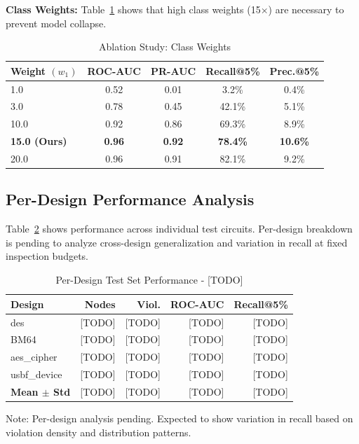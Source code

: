 \documentclass[10pt,twocolumn,journal]{IEEEtran}
\begin{document}
\textbf{Class Weights:} Table~\ref{tab:ablation_weights} shows that high class weights (15$\times$) are necessary to prevent model collapse.

\begin{table}[t]
\centering
\caption{Ablation Study: Class Weights}
\label{tab:ablation_weights}
\begin{tabular}{@{}lcccc@{}}
\toprule
\textbf{Weight $(w_1)$} & \textbf{ROC-AUC} & \textbf{PR-AUC} & \textbf{Recall@5\%} & \textbf{Prec.@5\%} \\
\midrule
1.0 & 0.52 & 0.01 & 3.2\% & 0.4\% \\
3.0 & 0.78 & 0.45 & 42.1\% & 5.1\% \\
10.0 & 0.92 & 0.86 & 69.3\% & 8.9\% \\
\textbf{15.0 (Ours)} & \textbf{0.96} & \textbf{0.92} & \textbf{78.4\%} & \textbf{10.6\%} \\
20.0 & 0.96 & 0.91 & 82.1\% & 9.2\% \\
\bottomrule
\end{tabular}
\end{table}

\subsection{Per-Design Performance Analysis}

Table~\ref{tab:per_design} shows performance across individual test circuits. Per-design breakdown is pending to analyze cross-design generalization and variation in recall at fixed inspection budgets.

\begin{table}[t]
\centering
\caption{Per-Design Test Set Performance - [TODO]}
\label{tab:per_design}
\begin{tabular}{@{}lrrrr@{}}
\toprule
\textbf{Design} & \textbf{Nodes} & \textbf{Viol.} & \textbf{ROC-AUC} & \textbf{Recall@5\%} \\
\midrule
des & [TODO] & [TODO] & [TODO] & [TODO] \\
BM64 & [TODO] & [TODO] & [TODO] & [TODO] \\
aes\_cipher & [TODO] & [TODO] & [TODO] & [TODO] \\
usbf\_device & [TODO] & [TODO] & [TODO] & [TODO] \\
\midrule
\textbf{Mean $\pm$ Std} & [TODO] & [TODO] & [TODO] & [TODO] \\
\bottomrule
\end{tabular}
\vspace{-2mm}
\footnotesize{Note: Per-design analysis pending. Expected to show variation in recall based on violation density and distribution patterns.}
\end{table}
\end{document}
